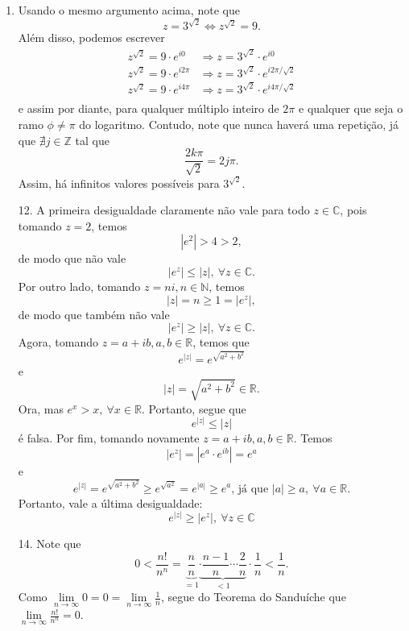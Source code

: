 \documentclass[12pt,a4paper]{article}
\begin{document}
\begin{enumerate}
		\item Usando o mesmo argumento acima, note que
		$$
		z = 3^{\sqrt{2}} \Longleftrightarrow z^{\sqrt{2}} = 9.
		$$
		Além disso, podemos escrever
		\begin{align*}
		z^{\sqrt{2}} = 9\cdot e^{i0} &\Longrightarrow z = 3^{\sqrt{2}}\cdot e^{i0} \\
		z^{\sqrt{2}} = 9\cdot e^{i2\pi} &\Longrightarrow z = 3^{\sqrt{2}}\cdot e^{i2\pi/\sqrt{2}} \\
		z^{\sqrt{2}} = 9\cdot e^{i4\pi} &\Longrightarrow z = 3^{\sqrt{2}}\cdot e^{i4\pi/\sqrt{2}} \\ 
		\end{align*}
		e assim por diante, para qualquer múltiplo inteiro de $2\pi$ e qualquer que seja o ramo $\phi\neq \pi$ do logaritmo. Contudo, note que nunca haverá uma repetição, já que $\nexists j\in\mathbb{Z}$ tal que
		$$
		\frac{2k\pi}{\sqrt{2}} = 2j\pi.
		$$
		Assim, há infinitos valores possíveis para $3^{\sqrt{2}}$.
		
		\item[12.] A primeira desigualdade claramente não vale para todo $z\in\mathbb{C}$, pois tomando $z=2$, temos
		$$
		|e^2| > 4 > 2,
		$$
		de modo que não vale 
		$$
		|e^z|\leq |z|, \ \forall z\in\mathbb{C}.
		$$
		Por outro lado, tomando $z=ni, n\in\mathbb{N}$, temos 
		$$
		|z| = n \geq 1 = |e^z|,
		$$
		de modo que também não vale 
		$$
		|e^z|\geq |z|, \ \forall z\in\mathbb{C}.
		$$
		Agora, tomando $z=a+ib, a,b\in\mathbb{R}$, temos que
		$$
		e^{|z|} = e^{\sqrt{a^2+b^2}}
		$$
		e
		$$
		|z| = \sqrt{a^2+b^2}\in\mathbb{R}.
		$$
		Ora, mas $e^x>x, \ \forall x\in\mathbb{R}$. Portanto, segue que
		$$
		e^{|z|} \leq |z|
		$$
		é falsa. Por fim, tomando novamente $z=a+ib, a,b\in\mathbb{R}$. Temos
		$$
		|e^z| = |e^a\cdot e^{ib}| = e^a
		$$
		e
		$$
		e^{|z|} = e^{\sqrt{a^2+b^2}}\geq e^{\sqrt{a^2}} = e^{|a|}\geq e^a\text{, já que } |a|\geq a, \ \forall a\in\mathbb{R}.
		$$
		Portanto, vale a última desigualdade:
		$$
		e^{|z|}\geq |e^z|, \ \forall  z\in\mathbb{C}
		$$
		
		\item [14.] Note que
		$$
		0 < \frac{n!}{n^n} = \underbrace{\frac{n}{n}}_{=1}\underbrace{\cdot\frac{n-1}{n}\cdots\frac{2}{n}}_{<1}\cdot\frac{1}{n} < \frac{1}{n}.
		$$
		Como $\displaystyle{\lim\limits_{n\to\infty} 0 = 0 = \lim\limits_{n\to\infty}\frac{1}{n}}$, segue do Teorema do Sanduíche que $\displaystyle{\lim\limits_{n\to\infty} \frac{n!}{n^n} = 0}$. 
		

\end{enumerate}
\end{document}
